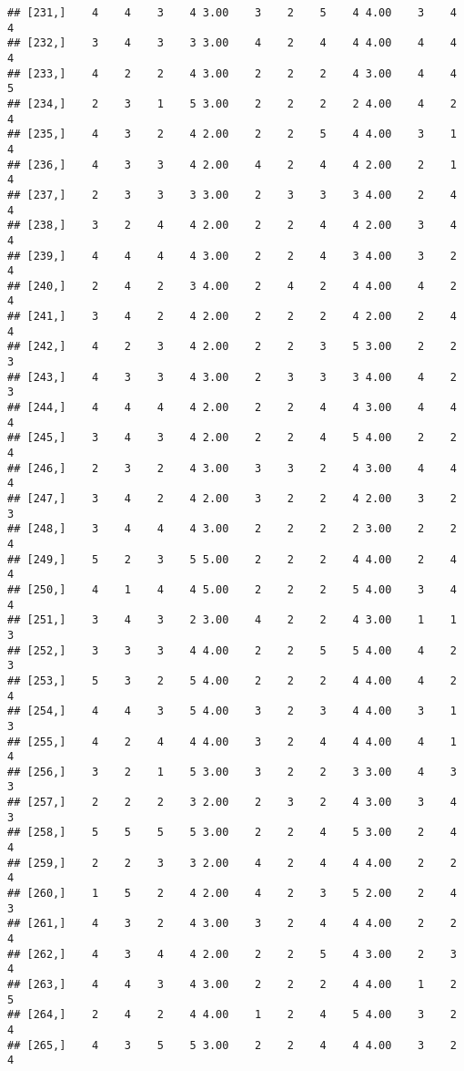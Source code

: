 \documentclass[]{article}
\begin{document}
\begin{verbatim}
## [231,]    4    4    3    4 3.00    3    2    5    4 4.00    3    4    4
## [232,]    3    4    3    3 3.00    4    2    4    4 4.00    4    4    4
## [233,]    4    2    2    4 3.00    2    2    2    4 3.00    4    4    5
## [234,]    2    3    1    5 3.00    2    2    2    2 4.00    4    2    4
## [235,]    4    3    2    4 2.00    2    2    5    4 4.00    3    1    4
## [236,]    4    3    3    4 2.00    4    2    4    4 2.00    2    1    4
## [237,]    2    3    3    3 3.00    2    3    3    3 4.00    2    4    4
## [238,]    3    2    4    4 2.00    2    2    4    4 2.00    3    4    4
## [239,]    4    4    4    4 3.00    2    2    4    3 4.00    3    2    4
## [240,]    2    4    2    3 4.00    2    4    2    4 4.00    4    2    4
## [241,]    3    4    2    4 2.00    2    2    2    4 2.00    2    4    4
## [242,]    4    2    3    4 2.00    2    2    3    5 3.00    2    2    3
## [243,]    4    3    3    4 3.00    2    3    3    3 4.00    4    2    3
## [244,]    4    4    4    4 2.00    2    2    4    4 3.00    4    4    4
## [245,]    3    4    3    4 2.00    2    2    4    5 4.00    2    2    4
## [246,]    2    3    2    4 3.00    3    3    2    4 3.00    4    4    4
## [247,]    3    4    2    4 2.00    3    2    2    4 2.00    3    2    3
## [248,]    3    4    4    4 3.00    2    2    2    2 3.00    2    2    4
## [249,]    5    2    3    5 5.00    2    2    2    4 4.00    2    4    4
## [250,]    4    1    4    4 5.00    2    2    2    5 4.00    3    4    4
## [251,]    3    4    3    2 3.00    4    2    2    4 3.00    1    1    3
## [252,]    3    3    3    4 4.00    2    2    5    5 4.00    4    2    3
## [253,]    5    3    2    5 4.00    2    2    2    4 4.00    4    2    4
## [254,]    4    4    3    5 4.00    3    2    3    4 4.00    3    1    3
## [255,]    4    2    4    4 4.00    3    2    4    4 4.00    4    1    4
## [256,]    3    2    1    5 3.00    3    2    2    3 3.00    4    3    3
## [257,]    2    2    2    3 2.00    2    3    2    4 3.00    3    4    3
## [258,]    5    5    5    5 3.00    2    2    4    5 3.00    2    4    4
## [259,]    2    2    3    3 2.00    4    2    4    4 4.00    2    2    4
## [260,]    1    5    2    4 2.00    4    2    3    5 2.00    2    4    3
## [261,]    4    3    2    4 3.00    3    2    4    4 4.00    2    2    4
## [262,]    4    3    4    4 2.00    2    2    5    4 3.00    2    3    4
## [263,]    4    4    3    4 3.00    2    2    2    4 4.00    1    2    5
## [264,]    2    4    2    4 4.00    1    2    4    5 4.00    3    2    4
## [265,]    4    3    5    5 3.00    2    2    4    4 4.00    3    2    4

\end{verbatim}
\end{document}
